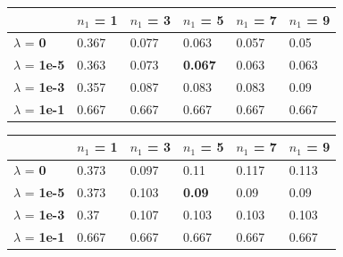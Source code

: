 \documentclass[10pt]{article}
\begin{document}
\begin{table}
\centering
\begin{tabular}{llllll}
\toprule
& $n_1$ = \bf{1} & $n_1$ =  \bf{3} & $n_1$ =  \bf{5} & $n_1$ =  \bf{7} & $n_1$ =  \bf{9} \\
\midrule
$\lambda$ = \bf{0} &       0.367 & 0.077 & 0.063 & 0.057 & 0.05  \\
$\lambda$ = \bf{1e-5} &   0.363 & 0.073 & \bf{0.067} & 0.063 & 0.063 \\
$\lambda$ = \bf{1e-3} &   0.357 & 0.087 & 0.083 & 0.083 & 0.09  \\
$\lambda$ = \bf{1e-1} &   0.667 & 0.667 & 0.667 & 0.667 & 0.667 \\
\bottomrule
\end{tabular}
\end{table}
	
\begin{table}
\centering
\begin{tabular}{llllll}
\toprule
& $n_1$ = \bf{1} & $n_1$ =  \bf{3} & $n_1$ =  \bf{5} & $n_1$ =  \bf{7} & $n_1$ =  \bf{9} \\
\midrule
$\lambda$ = \bf{0} &        0.373 & 0.097 & 0.11  & 0.117 & 0.113 \\
$\lambda$ = \bf{1e-5} &    0.373 & 0.103 & \bf{0.09}  & 0.09  & 0.09  \\
$\lambda$ = \bf{1e-3} &    0.37  & 0.107 & 0.103 & 0.103 & 0.103 \\
$\lambda$ = \bf{1e-1} &    0.667 & 0.667 & 0.667 & 0.667 & 0.667 \\
\bottomrule
\end{tabular}
\end{table}
	
	
\end{document}
